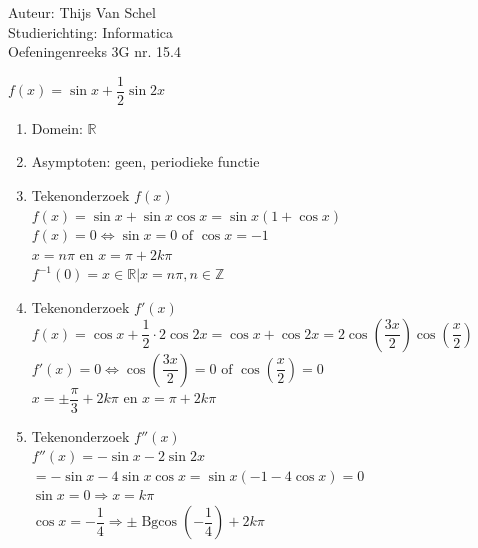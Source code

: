 \documentclass[a4paper]{article}
\begin{document}
  
\noindent \large Auteur: Thijs Van Schel \\
\noindent \large Studierichting: Informatica\\
\noindent \large Oefeningenreeks 3G nr. 15.4\\

\medskip

$f(x) = \sin x + \dfrac{1}{2}\sin 2x$\\

\begin{enumerate}
	\item Domein: $\mathbb{R}$\\

	\item Asymptoten: geen, periodieke functie\\

	\item Tekenonderzoek $f(x)$\\

	$f(x) = \sin x + \sin x\cos x = \sin x(1+\cos x)$\\

	$f(x) = 0 \Leftrightarrow \sin x = 0 \text{ of } \cos x = -1$\\

	$ x = n\pi \text{ en } x = \pi + 2k\pi$\\

	$f^{-1}(0) = {x \in \mathbb{R} | x = n\pi, n \in \mathbb{Z}}$\\

	\item Tekenonderzoek $f'(x)$\\

	$f(x) = \cos x + \dfrac{1}{2}\cdot 2\cos 2x = \cos x + \cos 2x = 2\cos\left(\dfrac{3x}{2}\right)\cos\left(\dfrac{x}{2}\right)$\\

	$f'(x) = 0 \Leftrightarrow \cos\left(\dfrac{3x}{2}\right) = 0 \text{ of } \cos\left(\dfrac{x}{2}\right) = 0$\\

	$ x = \pm \dfrac{\pi}{3} + 2k\pi \text{ en } x = \pi+2k\pi$\\

	\item Tekenonderzoek $f''(x)$\\

	$f''(x) = -\sin x - 2\sin 2x$\\

	$ = -\sin x - 4\sin x\cos x = \sin x(-1-4\cos x) = 0$\\

	$\sin x = 0 \Rightarrow x = k\pi$\\

	$\cos x = -\dfrac{1}{4} \Rightarrow \pm \operatorname{Bgcos}\left(-\dfrac{1}{4}\right)+2k\pi$\\
\end{enumerate}
\end{document}
